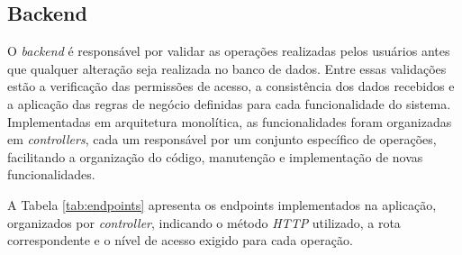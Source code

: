 \documentclass[12pt]{unisenaiclass}
\begin{document}
\subsection{Backend}

O \textit{backend} é responsável por validar as operações realizadas pelos usuários antes que qualquer alteração seja realizada no banco de dados. Entre essas validações estão a verificação das permissões de acesso, a consistência dos dados recebidos e a aplicação das regras de negócio definidas para cada funcionalidade do sistema. Implementadas em arquitetura monolítica, as funcionalidades foram organizadas em \textit{controllers}, cada um responsável por um conjunto específico de operações, facilitando a organização do código, manutenção e implementação de novas funcionalidades.

A Tabela \ref{tab:endpoints} apresenta os endpoints implementados na aplicação, organizados por \textit{controller}, indicando o método \textit{HTTP} utilizado, a rota correspondente e o nível de acesso exigido para cada operação.

\renewcommand{\arraystretch}{1.0}
\end{document}
